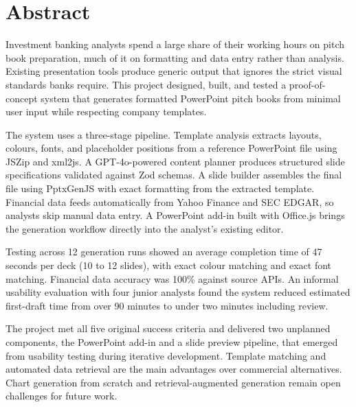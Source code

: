 \section*{Abstract}

Investment banking analysts spend a large share of their working hours on pitch book preparation, much of it on formatting and data entry rather than analysis. Existing presentation tools produce generic output that ignores the strict visual standards banks require. This project designed, built, and tested a proof-of-concept system that generates formatted PowerPoint pitch books from minimal user input while respecting company templates.

The system uses a three-stage pipeline. Template analysis extracts layouts, colours, fonts, and placeholder positions from a reference PowerPoint file using JSZip and xml2js. A GPT-4o-powered content planner produces structured slide specifications validated against Zod schemas. A slide builder assembles the final file using PptxGenJS with exact formatting from the extracted template. Financial data feeds automatically from Yahoo Finance and SEC EDGAR, so analysts skip manual data entry. A PowerPoint add-in built with Office.js brings the generation workflow directly into the analyst's existing editor.

Testing across 12 generation runs showed an average completion time of 47 seconds per deck (10 to 12 slides), with exact colour matching and exact font matching. Financial data accuracy was 100\% against source APIs. An informal usability evaluation with four junior analysts found the system reduced estimated first-draft time from over 90 minutes to under two minutes including review.

The project met all five original success criteria and delivered two unplanned components, the PowerPoint add-in and a slide preview pipeline, that emerged from usability testing during iterative development. Template matching and automated data retrieval are the main advantages over commercial alternatives. Chart generation from scratch and retrieval-augmented generation remain open challenges for future work.
